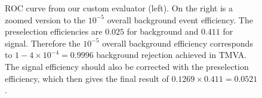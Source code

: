 \begin{figure}[h]
\begin{center}
\begin{minipage}{.3\textwidth}
    \end{minipage}
  \end{center}
  \caption{ROC curve from our custom evaluator (left). On the right is
    a zoomed version to the $10^{-5}$ overall background event
    efficiency. The preselection efficiencies are $0.025$ for
    background and $0.411$ for signal. Therefore the $10^{-5}$ overall
    background efficiency corresponds to $1-4\times 10^{-4}=0.9996$
    background rejection achieved in TMVA. The signal efficiency
    should also be corrected with the preselection efficiency, which
    then gives the final result of $0.1269\times 0.411 = 0.0521$.}
  \label{fig:mkRocEvent}
\end{figure}

\clearpage